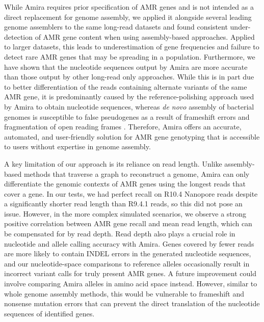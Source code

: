 While Amira requires prior specification of AMR genes and is not intended as a direct replacement for genome assembly, we applied it alongside several leading genome assemblers to the same long-read datasets and found consistent under-detection of AMR gene content when using assembly-based approaches. Applied to larger datasets, this leads to underestimation of gene frequencies and failure to detect rare AMR genes that may be spreading in a population. Furthermore, we have shown that the nucleotide sequences output by Amira are more accurate than those output by other long-read only approaches. While this is in part due to better differentiation of the reads containing alternate variants of the same AMR gene, it is predominantly caused by the reference-polishing approach used by Amira to obtain nucleotide sequences, whereas \textit{de novo} assembly of bacterial genomes is susceptible to false pseudogenes as a result of frameshift errors and fragmentation of open reading frames \cite{Cooley2024}. Therefore, Amira offers an accurate, automated, and user-friendly solution for AMR gene genotyping that is accessible to users without expertise in genome assembly. 

A key limitation of our approach is its reliance on read length. Unlike assembly-based methods that traverse a graph to reconstruct a genome, Amira can only differentiate the genomic contexts of AMR genes using the longest reads that cover a gene. In our tests, we had perfect recall on R10.4 Nanopore reads despite a significantly shorter read length than R9.4.1 reads, so this did not pose an issue. However, in the more complex simulated scenarios, we observe a strong positive correlation between AMR gene recall and mean read length, which can be compensated for by read depth. Read depth also plays a crucial role in nucleotide and allele calling accuracy with Amira. Genes covered by fewer reads are more likely to contain INDEL errors in the generated nucleotide sequences, and our nucleotide-space comparisons to reference alleles occasionally result in incorrect variant calls for truly present AMR genes. A future improvement could involve comparing Amira alleles in amino acid space instead. However, similar to whole genome assembly methods, this would be vulnerable to frameshift and nonsense mutation errors that can prevent the direct translation of the nucleotide sequences of identified genes.

